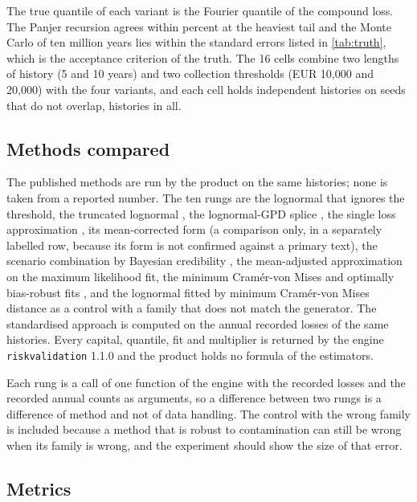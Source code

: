 

The true quantile of each variant is the Fourier quantile of the compound loss. The Panjer recursion agrees within \panGapD{} percent at the heaviest tail and the Monte Carlo of ten million years lies within the standard errors listed in \cref{tab:truth}, which is the acceptance criterion of the truth. The 16 cells combine two lengths of history (5 and 10 years) and two collection thresholds (EUR 10,000 and 20,000) with the four variants, and each cell holds \nPer{} independent histories on seeds that do not overlap, \nHist{} histories in all.

\subsection{Methods compared}
\label{sec:ed-methods}

The published methods are run by the product on the same histories; none is taken from a reported number. The ten rungs are the lognormal that ignores the threshold, the truncated lognormal \citep{mignola2007,cope2009}, the lognormal-GPD splice \citep{chavez2006}, the single loss approximation \citep{degen2010,embrechts1997}, its mean-corrected form (a comparison only, in a separately labelled row, because its form is not confirmed against a primary text), the scenario combination by Bayesian credibility \citep{shevchenko2006}, the mean-adjusted approximation on the maximum likelihood fit,
the minimum Cram\'er-von Mises and optimally bias-robust fits \citep{opdyke2012}, and the lognormal fitted by minimum Cram\'er-von Mises distance as a control with a family that does not match the generator. The standardised approach \citep{ope25} is computed on the annual recorded losses of the same histories. Every capital, quantile, fit and multiplier is returned by the engine \texttt{riskvalidation} 1.1.0 and the product holds no formula of the estimators.

Each rung is a call of one function of the engine with the recorded losses and the recorded annual counts as arguments, so a difference between two rungs is a difference of method and not of data handling. The control with the wrong family is included because a method that is robust to contamination can still be wrong when its family is wrong, and the experiment should show the size of that error.

\subsection{Metrics}
\label{sec:ed-metrics}

